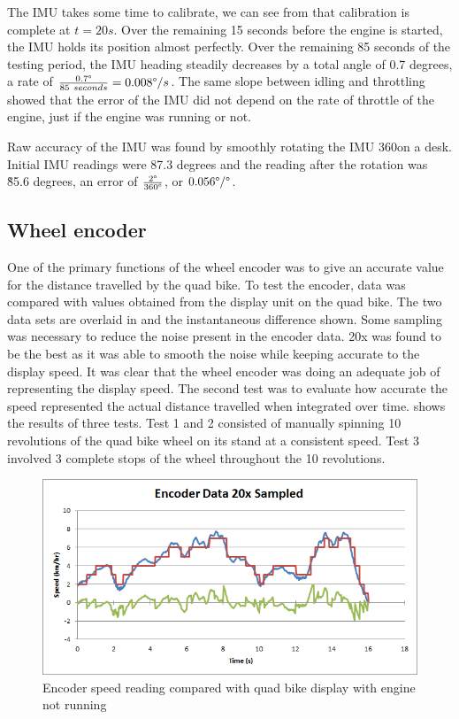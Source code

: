 \documentclass[main.tex]{subfiles}
\begin{document}
The IMU takes some time to calibrate, we can see from  that calibration is complete at $t=20s$. Over the remaining 15 seconds before the engine is started, the IMU holds its position almost perfectly. Over the remaining 85 seconds of the testing period, the IMU heading steadily decreases by a total angle of 0.7 degrees, a rate of $\frac{0.7\degree}{85\ seconds} = 0.008 \degree/s$. The same slope between idling and throttling showed that the error of the IMU did not depend on the rate of throttle of the engine, just if the engine was running or not.

Raw accuracy of the IMU was found by smoothly rotating the IMU 360\degree on a desk. Initial IMU readings were 87.3 degrees and the reading after the rotation was \~85.6 degrees, an error of $\frac{2\degree}{360\degree}$, or $0.056\degree/\degree$.

\subsection{Wheel encoder}
One of the primary functions of the wheel encoder was to give an accurate value for the distance travelled by the quad bike. To test the encoder, data was compared with values obtained from the display unit on the quad bike. The two data sets are overlaid in  and the instantaneous difference shown. Some sampling was necessary to reduce the noise present in the encoder data. 20x was found to be the best as it was able to smooth the noise while keeping accurate to the display speed. It was clear that the wheel encoder was doing an adequate job of representing the display speed. The second test was to evaluate how accurate the speed represented the actual distance travelled when integrated over time.  shows the results of three tests. Test 1 and 2 consisted of manually spinning 10 revolutions of the quad bike wheel on its stand at a consistent speed. Test 3 involved 3 complete stops of the wheel throughout the 10 revolutions.

\begin{figure}[ht]
\includegraphics[width=1\textwidth]{5-Testing/encoder_data_20x_sampled.png}
\centering
\caption{Encoder speed reading compared with quad bike display with engine not running}
\end{figure}
\end{document}
